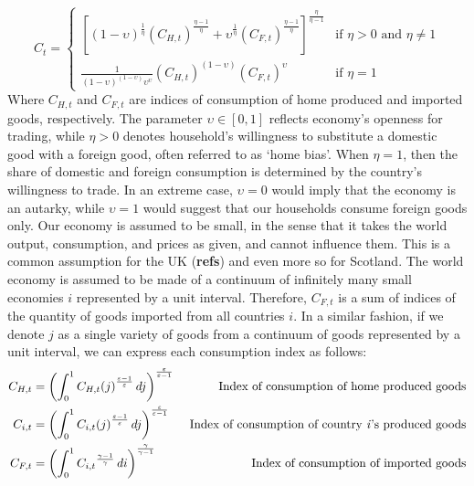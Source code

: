 \begin{equation}
    C_t = 
    \begin{cases}
        \left[ (1-\upsilon)^\frac{1}{\eta} (C_{H,t})^{\frac{\eta-1}{\eta}} + \upsilon^{\frac{1}{\eta}}(C_{F,t})^{\frac{\eta-1}{\eta}}\right]^{\frac{\eta}{\eta-1}} & \text{if $\eta > 0$ and $\eta \ne 1$} \\
        \frac{1}{(1-\upsilon)^{(1-\upsilon)}\upsilon^\upsilon}(C_{H,t})^{(1-\upsilon)}(C_{F,t})^\upsilon & \text{if $\eta = 1$}
    \end{cases}
\end{equation}
Where $C_{H,t}$ and $C_{F,t}$ are indices of consumption of home produced and imported goods, respectively. The parameter $\upsilon \in [0,1]$ reflects economy's openness for trading, while $\eta > 0$ denotes household's willingness to substitute a domestic good with a foreign good, often referred to as `home bias'. When $\eta = 1$, then the share of domestic and foreign consumption is determined by the country's willingness to trade. In an extreme case, $\upsilon = 0$ would imply that the economy is an autarky, while $\upsilon = 1$ would suggest that our households consume foreign goods only. Our economy is assumed to be small, in the sense that it takes the world output, consumption, and prices as given, and cannot influence them. This is a common assumption for the UK (\textbf{refs}) and even more so for Scotland. The world economy is assumed to be made of a continuum of infinitely many small economies $i$ represented by a unit interval. Therefore, $C_{F,t}$ is a sum of indices of the quantity of goods imported from all countries $i$. In a similar fashion, if we denote $j$ as a single variety of goods from a continuum of goods represented by a unit interval, we can express each consumption index as follows: 
\begin{align*}
    C_{H,t} & = \left( \int_{0}^{1} {C_{H,t}(j)}^{\frac{\varepsilon-1}{\varepsilon}} \,dj  \right)^\frac{\varepsilon}{\varepsilon-1} & \text{ Index of consumption of home produced goods}                 \\
    C_{i,t} & = \left( \int_{0}^{1} {C_{i,t}(j)}^{\frac{\varepsilon-1}{\varepsilon}} \,dj  \right)^\frac{\varepsilon}{\varepsilon-1} & \text{ Index of consumption of country \textit{i}'s produced goods} \\
    C_{F,t} & = \left( \int_{0}^{1} {C_{i,t}}^{\frac{\gamma-1}{\gamma}} \,di  \right)^{\frac{\gamma}{\gamma-1}}                      & \text{ Index of consumption of imported goods}
\end{align*}
